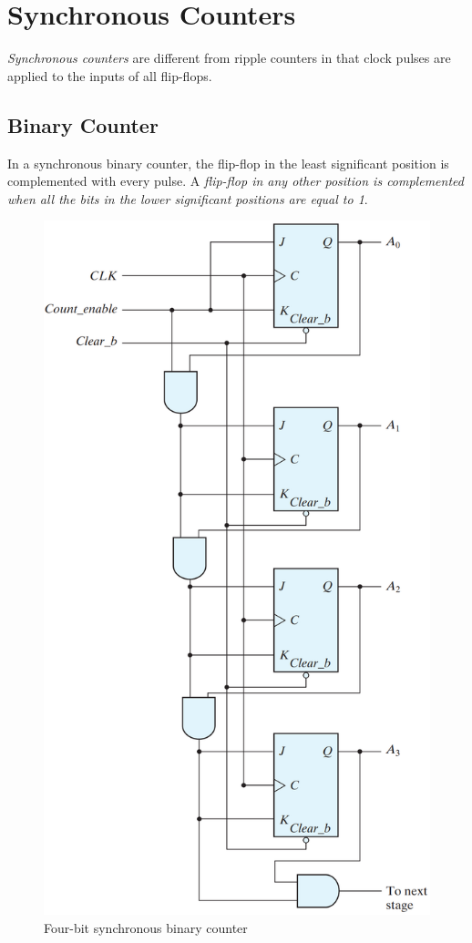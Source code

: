 \section{Synchronous Counters}
\label{sec:synchronous-counters}

\textit{Synchronous counters} are different from ripple counters in that clock pulses are applied to the inputs of all flip-flops.

\subsection{Binary Counter}
\label{subsec:binary-counter}

In a synchronous binary counter, the flip-flop in the least significant position is complemented with every pulse. A \textit{flip-flop in any other position is complemented when all the bits in the lower significant positions are equal to 1}. 

\begin{figure}[H]
  \centering
  \includegraphics[width=.7\linewidth]{img/fig-6.12.png}
  \caption{Four-bit synchronous binary counter}
  \label{fig:6.12}
\end{figure}

